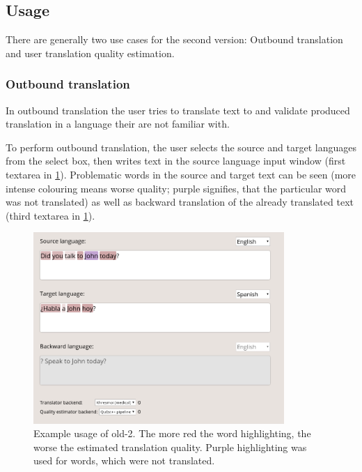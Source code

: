 \subsection{Usage}

There are generally two use cases for the second version: Outbound translation and user translation quality estimation.

\subsubsection*{Outbound translation}

In outbound translation the user tries to translate text to and validate produced translation in a language their are not familiar with.

To perform outbound translation, the user selects the source and target languages from the select box, then writes text in the source language input window (first textarea in \cref{fig:ptakopet_old-2/john_screen}). Problematic words in the source and target text can be seen (more intense colouring means worse quality; purple signifies, that the particular word was not translated) as well as backward translation of the already translated text (third textarea in \cref{fig:ptakopet_old-2/john_screen}).

\begin{figure}[ht]
    \centering
    \includegraphics[width=0.85\textwidth]{img/ptakopet_old-2/john_screen}
    \caption{Example usage of \ptakopet{} old-2. The more red the word highlighting, the worse the estimated translation quality. Purple highlighting was used for words, which were not translated.}
    \label{fig:ptakopet_old-2/john_screen}
\end{figure}

